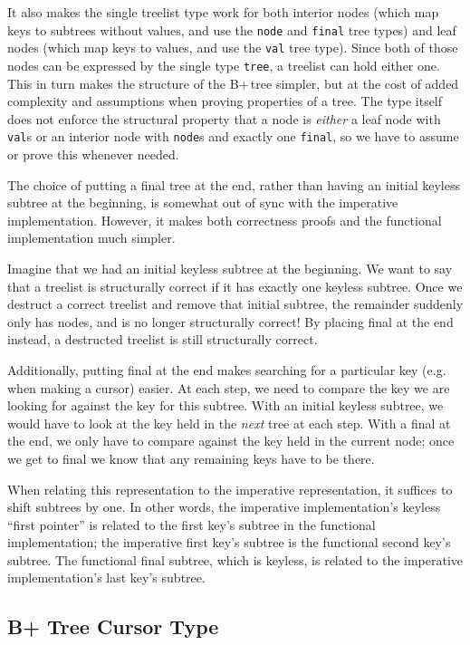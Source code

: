 \documentclass[12pt]{article}
\begin{document}
It also makes the single treelist type work for both interior nodes (which map keys to subtrees without values, and use the \texttt{node} and \texttt{final} tree types) and leaf nodes (which map keys to values, and use the \texttt{val} tree type). Since both of those nodes can be expressed by the single type \texttt{tree}, a treelist can hold either one. This in turn makes the structure of the B+\,tree simpler, but at the cost of added complexity and assumptions when proving properties of a tree. The type itself does not enforce the structural property that a node is \textit{either} a leaf node with \texttt{val}s or an interior node with \texttt{node}s and exactly one \texttt{final}, so we have to assume or prove this whenever needed.

The choice of putting a final tree at the end, rather than having an initial keyless subtree at the beginning, is somewhat out of sync with the imperative implementation. However, it makes both correctness proofs and the functional implementation much simpler.

Imagine that we had an initial keyless subtree at the beginning. We want to say that a treelist is structurally correct if it has exactly one keyless subtree. Once we destruct a correct treelist and remove that initial subtree, the remainder suddenly only has nodes, and is no longer structurally correct! By placing final at the end instead, a destructed treelist is still structurally correct.

Additionally, putting final at the end makes searching for a particular key (e.g. when making a cursor) easier. At each step, we need to compare the key we are looking for against the key for this subtree. With an initial keyless subtree, we would have to look at the key held in the \textit{next} tree at each step. With a final at the end, we only have to compare against the key held in the current node; once we get to final we know that any remaining keys have to be there.

When relating this representation to the imperative representation, it suffices to shift subtrees by one. In other words, the imperative implementation’s keyless “first pointer” is related to the first key’s subtree in the functional implementation; the imperative first key’s subtree is the functional second key’s subtree. The functional final subtree, which is keyless, is related to the imperative implementation’s last key’s subtree.

\subsection{B+ Tree Cursor Type}
\label{subsec:cursortype}
\end{document}
